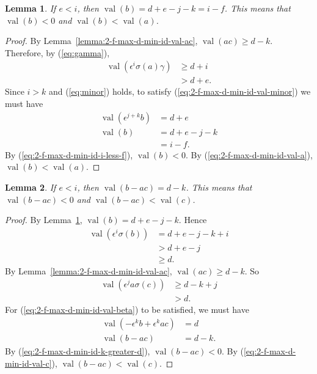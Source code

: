 \documentclass{amsart}
\newtheorem{lemma}{Lemma}[subsection]
\theoremstyle{definition}
\def\e{\epsilon}
\def\val{\mathop{\mathrm{val}}}
\def\s{\sigma}
\begin{document}
  \begin{lemma}
    \label{lemma:2-f-max-d-min-id-e-l-i-val-b}
    If $e < i$, then $\val(b) = d + e - j - k = i - f$.  This means that
    $\val(b) < 0$ and $\val(b) < \val(a)$.
  \end{lemma}
  \begin{proof}
    By Lemma~\ref{lemma:2-f-max-d-min-id-val-ac}, $\val(ac) \ge d -k$.
    Therefore, by (\ref{eq:gamma}),
    \begin{align*}
      \val(\e^i\s(a)\gamma) &\ge d + i \\
       &> d + e.
    \end{align*}
    Since $i > k$ and (\ref{eq:minor}) holds, to satisfy
    (\ref{eq:2-f-max-d-min-id-val-minor}) we must have
    \begin{align*}
      \val(\e^{j+k} b) &= d + e \\
      \val(b) &= d + e - j - k \\
      &= i - f.
    \end{align*}
    By (\ref{eq:2-f-max-d-min-id-i-less-f}), $\val(b) < 0$.  By
    (\ref{eq:2-f-max-d-min-id-val-a}), $\val(b) < \val(a)$.
  \end{proof}

  \begin{lemma}
    If $e < i$, then $\val(b-ac) = d -k$.  This means that $\val(b-ac) < 0$ and
    $\val(b-ac) < \val(c)$.
  \end{lemma}
  \begin{proof}
    By Lemma~\ref{lemma:2-f-max-d-min-id-e-l-i-val-b}, $\val(b) = d + e - j - k$.
    Hence
    \begin{align*}
      \val(\e^i \s(b)) &= d + e - j - k + i \\
      &> d + e - j \\
      &\ge d.
    \end{align*}
    By Lemma~\ref{lemma:2-f-max-d-min-id-val-ac}, $\val(ac) \ge d-k$.  So
    \begin{align*}
      \val(\e^j a \s(c)) &\ge d - k + j \\
      &> d.
    \end{align*}
    For (\ref{eq:2-f-max-d-min-id-val-beta}) to be satisfied, we must have
    \begin{align*}
      \val(-\e^k b + \e^k ac) &= d\\
      \val(b - ac) &= d-k.
    \end{align*}
    By (\ref{eq:2-f-max-d-min-id-k-greater-d}), $\val(b-ac) < 0$.  By
    (\ref{eq:2-f-max-d-min-id-val-c}), $\val(b-ac) < \val(c)$.
  \end{proof}
\end{document}
